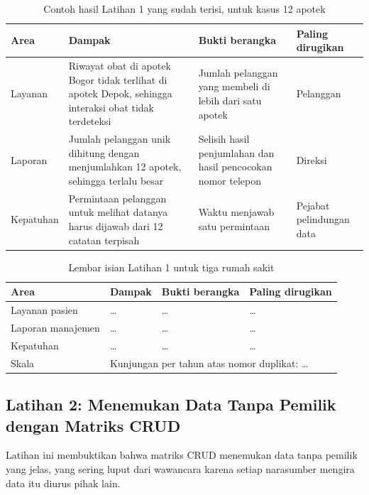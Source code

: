 \begin{table}[!htb]
  \centering
  \caption{Contoh hasil Latihan 1 yang sudah terisi, untuk kasus 12 apotek}
  \label{tab:ch06-lat1-contoh}
  \begin{tabularx}{\textwidth}{lXXl}
    \hline
    \textbf{Area} & \textbf{Dampak} & \textbf{Bukti berangka} &
      \textbf{Paling dirugikan} \\
    \hline
    Layanan & Riwayat obat di apotek Bogor tidak terlihat di apotek Depok,
      sehingga interaksi obat tidak terdeteksi & Jumlah pelanggan yang membeli
      di lebih dari satu apotek & Pelanggan \\
    \hline
    Laporan & Jumlah pelanggan unik dihitung dengan menjumlahkan 12 apotek,
      sehingga terlalu besar & Selisih hasil penjumlahan dan hasil pencocokan
      nomor telepon & Direksi \\
    \hline
    Kepatuhan & Permintaan pelanggan untuk melihat datanya harus dijawab dari
      12 catatan terpisah & Waktu menjawab satu permintaan & Pejabat
      pelindungan data \\
    \hline
  \end{tabularx}
\end{table}

\begin{table}[!htb]
  \centering
  \caption{Lembar isian Latihan 1 untuk tiga rumah sakit}
  \label{tab:ch06-lat1-hasil}
  \begin{tabularx}{\textwidth}{lXXl}
    \hline
    \textbf{Area} & \textbf{Dampak} & \textbf{Bukti berangka} &
      \textbf{Paling dirugikan} \\
    \hline
    Layanan pasien & \dots & \dots & \dots \\
    \hline
    Laporan manajemen & \dots & \dots & \dots \\
    \hline
    Kepatuhan & \dots & \dots & \dots \\
    \hline
    Skala & \multicolumn{3}{l}{Kunjungan per tahun atas nomor duplikat: \dots} \\
    \hline
  \end{tabularx}
\end{table}

\subsection*{Latihan 2: Menemukan Data Tanpa Pemilik dengan Matriks CRUD}

Latihan ini membuktikan bahwa matriks CRUD menemukan data tanpa pemilik yang
jelas, yang sering luput dari wawancara karena setiap narasumber mengira data
itu diurus pihak lain.

